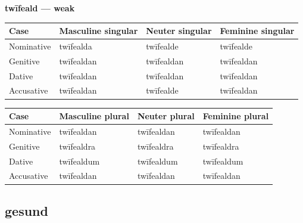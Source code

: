 \textbf{twīfeald — weak}

\par\begingroup
\fontsize{10.5}{13.2}\selectfont
\setlength{\LTleft}{0pt}\setlength{\LTright}{\fill}
\noindent
\begin{tabular}{@{}>{\raggedright\arraybackslash}p{22.0mm}>{\raggedright\arraybackslash}p{31.188mm}>{\raggedright\arraybackslash}p{31.188mm}>{\raggedright\arraybackslash}p{31.188mm}@{}}
\toprule
\textbf{Case} & \textbf{Masculine singular} & \textbf{Neuter singular} & \textbf{Feminine singular} \\
\midrule
Nominative & twīfealda & twīfealde & twīfealde \\
Genitive & twīfealdan & twīfealdan & twīfealdan \\
Dative & twīfealdan & twīfealdan & twīfealdan \\
Accusative & twīfealdan & twīfealde & twīfealdan \\
\bottomrule
\end{tabular}
\par\endgroup
\par\addvspace{5pt}
\par\begingroup
\fontsize{10.5}{13.2}\selectfont
\setlength{\LTleft}{0pt}\setlength{\LTright}{\fill}
\noindent
\begin{tabular}{@{}>{\raggedright\arraybackslash}p{22.0mm}>{\raggedright\arraybackslash}p{31.188mm}>{\raggedright\arraybackslash}p{31.188mm}>{\raggedright\arraybackslash}p{31.188mm}@{}}
\toprule
\textbf{Case} & \textbf{Masculine plural} & \textbf{Neuter plural} & \textbf{Feminine plural} \\
\midrule
Nominative & twīfealdan & twīfealdan & twīfealdan \\
Genitive & twīfealdra & twīfealdra & twīfealdra \\
Dative & twīfealdum & twīfealdum & twīfealdum \\
Accusative & twīfealdan & twīfealdan & twīfealdan \\
\bottomrule
\end{tabular}
\par\endgroup

\subsection*{gesund}

